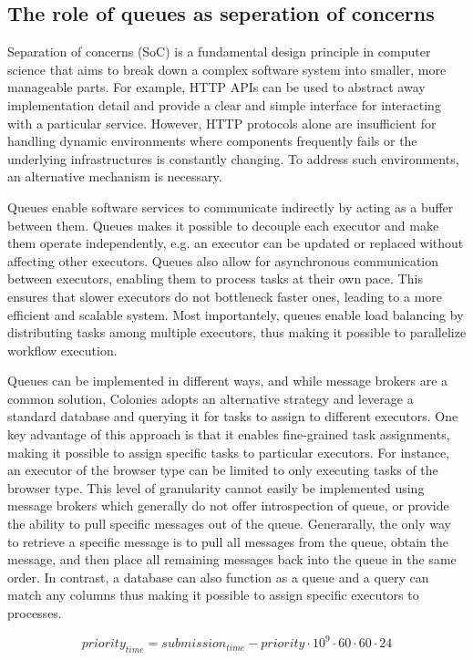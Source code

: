 \documentclass{article}
\begin{document}
\subsection{The role of queues as seperation of concerns}
Separation of concerns (SoC) is a fundamental design principle in computer science that aims to break down a complex software system into smaller, more manageable parts. For example, HTTP APIs can be used to abstract away implementation detail and provide a clear and simple interface for interacting with a particular service. However, HTTP protocols alone are insufficient for handling dynamic environments where components frequently fails or the underlying infrastructures is constantly changing. To address such environments, an alternative mechanism is necessary. 

Queues enable software services to communicate indirectly by acting as a buffer between them. Queues makes it possible to decouple each executor and make them operate independently, e.g. an executor can be updated or replaced without affecting other executors. Queues also allow for asynchronous communication between executors, enabling them to process tasks at their own pace. This ensures that slower executors do not bottleneck faster ones, leading to a more efficient and scalable system. Most importantely, queues enable load balancing by distributing tasks among multiple executors, thus making it possible to parallelize workflow execution. 

Queues can be implemented in different ways, and while message brokers are a common solution, Colonies adopts an alternative strategy and leverage a standard database and querying it for tasks to assign to different executors. One key advantage of this approach is that it enables fine-grained task assignments, making it possible to assign specific tasks to particular executors. For instance, an executor of the browser type can be limited to only executing tasks of the browser type. This level of granularity cannot easily be implemented using message brokers which generally do not offer introspection of queue, or provide the ability to pull specific messages out of the queue. Generarally, the only way to retrieve a specific message is to pull all messages from the queue, obtain the message, and then place all remaining messages back into the queue in the same order. In contrast, a database can also function as a queue and a query can match any columns thus making it possible to assign specific executors to processes.

\begin{equation}
    \label{eq:pt}
    priority_{time}=submission_{time} - priority \cdot 10^9 \cdot 60 \cdot 60 \cdot 24
\end{equation}
\end{document}
